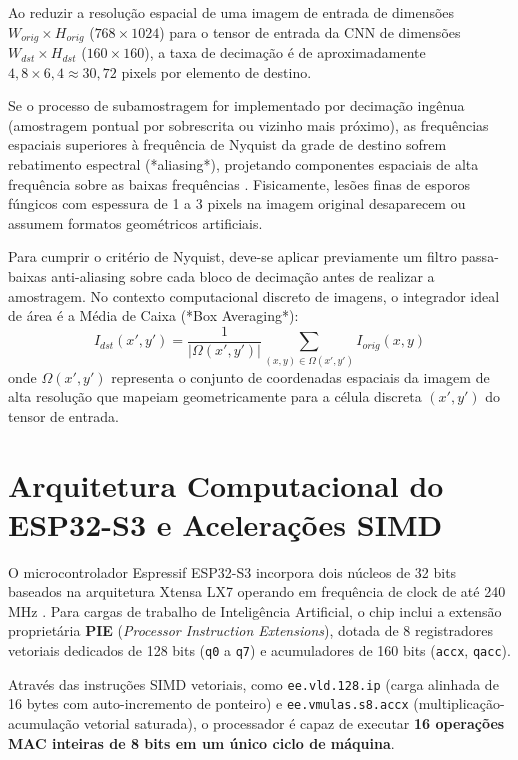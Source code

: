 Ao reduzir a resolução espacial de uma imagem de entrada de dimensões $W_{orig} \times H_{orig}$ ($768 \times 1024$) para o tensor de entrada da CNN de dimensões $W_{dst} \times H_{dst}$ ($160 \times 160$), a taxa de decimação é de aproximadamente $4,8 \times 6,4 \approx 30,72$ pixels por elemento de destino. 

Se o processo de subamostragem for implementado por decimação ingênua (amostragem pontual por sobrescrita ou vizinho mais próximo), as frequências espaciais superiores à frequência de Nyquist da grade de destino sofrem rebatimento espectral (*aliasing*), projetando componentes espaciais de alta frequência sobre as baixas frequências \cite{gonzalez2018digital}. Fisicamente, lesões finas de esporos fúngicos com espessura de 1 a 3 pixels na imagem original desaparecem ou assumem formatos geométricos artificiais.

Para cumprir o critério de Nyquist, deve-se aplicar previamente um filtro passa-baixas anti-aliasing sobre cada bloco de decimação antes de realizar a amostragem. No contexto computacional discreto de imagens, o integrador ideal de área é a Média de Caixa (*Box Averaging*):
\begin{equation}
I_{dst}(x', y') = \frac{1}{|\Omega(x', y')|} \sum_{(x, y) \in \Omega(x', y')} I_{orig}(x, y)
\label{eq:box_averaging}
\end{equation}
onde $\Omega(x', y')$ representa o conjunto de coordenadas espaciais da imagem de alta resolução que mapeiam geometricamente para a célula discreta $(x', y')$ do tensor de entrada.

\section{Arquitetura Computacional do ESP32-S3 e Acelerações SIMD}

O microcontrolador Espressif ESP32-S3 incorpora dois núcleos de 32 bits baseados na arquitetura Xtensa LX7 operando em frequência de clock de até 240 MHz \cite{espressif2023esp32s3}. Para cargas de trabalho de Inteligência Artificial, o chip inclui a extensão proprietária \textbf{PIE} (\textit{Processor Instruction Extensions}), dotada de 8 registradores vetoriais dedicados de 128 bits (\texttt{q0} a \texttt{q7}) e acumuladores de 160 bits (\texttt{accx}, \texttt{qacc}).

Através das instruções SIMD vetoriais, como \texttt{ee.vld.128.ip} (carga alinhada de 16 bytes com auto-incremento de ponteiro) e \texttt{ee.vmulas.s8.accx} (multiplicação-acumulação vetorial saturada), o processador é capaz de executar \textbf{16 operações MAC inteiras de 8 bits em um único ciclo de máquina}.

